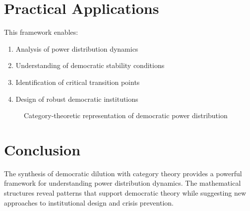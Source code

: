 \documentclass[12pt]{article}
\theoremstyle{plain}
\begin{document}
\section{Practical Applications}

This framework enables:
\begin{enumerate}
    \item Analysis of power distribution dynamics
    \item Understanding of democratic stability conditions
    \item Identification of critical transition points
    \item Design of robust democratic institutions
\end{enumerate}

\begin{figure}[h]
\centering
{}
\caption{Category-theoretic representation of democratic power distribution}
\end{figure}

\section{Conclusion}

The synthesis of democratic dilution with category theory provides a powerful framework for understanding power distribution dynamics. The mathematical structures reveal patterns that support democratic theory while suggesting new approaches to institutional design and crisis prevention.
\end{document}
